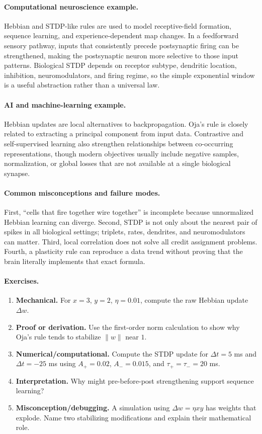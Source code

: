\paragraph{Computational neuroscience example.}
Hebbian and STDP-like rules are used to model receptive-field formation, sequence learning, and experience-dependent map changes. In a feedforward sensory pathway, inputs that consistently precede postsynaptic firing can be strengthened, making the postsynaptic neuron more selective to those input patterns. Biological STDP depends on receptor subtype, dendritic location, inhibition, neuromodulators, and firing regime, so the simple exponential window is a useful abstraction rather than a universal law.

\paragraph{AI and machine-learning example.}
Hebbian updates are local alternatives to backpropagation. Oja's rule is closely related to extracting a principal component from input data. Contrastive and self-supervised learning also strengthen relationships between co-occurring representations, though modern objectives usually include negative samples, normalization, or global losses that are not available at a single biological synapse.

\paragraph{Common misconceptions and failure modes.}
First, ``cells that fire together wire together'' is incomplete because unnormalized Hebbian learning can diverge. Second, STDP is not only about the nearest pair of spikes in all biological settings; triplets, rates, dendrites, and neuromodulators can matter. Third, local correlation does not solve all credit assignment problems. Fourth, a plasticity rule can reproduce a data trend without proving that the brain literally implements that exact formula.

\paragraph{Exercises.}
\begin{enumerate}[label=\textbf{45.3.\arabic*.}, leftmargin=*]
\item \textbf{Mechanical.} For \(x=3\), \(y=2\), \(\eta=0.01\), compute the raw Hebbian update \(\Delta w\).
\item \textbf{Proof or derivation.} Use the first-order norm calculation to show why Oja's rule tends to stabilize \(\|w\|\) near \(1\).
\item \textbf{Numerical/computational.} Compute the STDP update for \(\Delta t=5\) ms and \(\Delta t=-25\) ms using \(A_+=0.02\), \(A_-=0.015\), and \(\tau_+=\tau_-=20\) ms.
\item \textbf{Interpretation.} Why might pre-before-post strengthening support sequence learning?
\item \textbf{Misconception/debugging.} A simulation using \(\Delta w=\eta xy\) has weights that explode. Name two stabilizing modifications and explain their mathematical role.
\end{enumerate}

